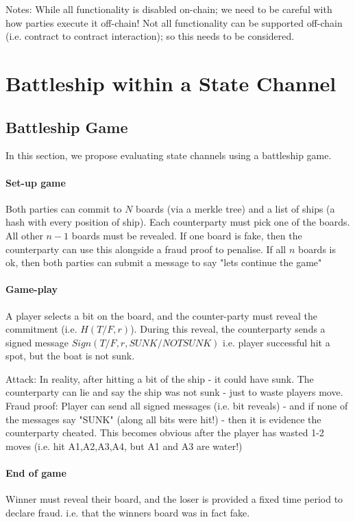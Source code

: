 \documentclass{article}
\begin{document}
Notes: While all functionality is disabled on-chain; we need to be careful with how parties execute it off-chain! Not all functionality can be supported off-chain (i.e. contract to contract interaction); so this needs to be considered. 

\section{Battleship within a State Channel} 

\subsection{Battleship Game} 
In this section, we propose evaluating state channels using a battleship game. 

\paragraph{Set-up game} Both parties can commit to $N$ boards (via a merkle tree) and a list of ships (a hash with every position of ship). Each counterparty must pick one of the boards. All other $n-1$ boards must be revealed. If one board is fake, then the counterparty can use this alongside a fraud proof to penalise. If all $n$ boards is ok, then both parties can submit a message to say "lets continue the game" 

\paragraph{Game-play} A player selects a bit on the board, and the counter-party must reveal the commitment (i.e. $H(T/F,r)$). During this reveal, the counterparty sends a signed message $Sign(T/F,r,SUNK/NOTSUNK)$ i.e. player successful hit a spot, but the boat is not sunk. 

Attack: In reality, after hitting a bit of the ship - it could have sunk. The counterparty can lie and say the ship was not sunk - just to waste players move. 
Fraud proof: Player can send all signed messages (i.e. bit reveals) - and if none of the messages say "SUNK" (along all bits were hit!) - then it is evidence the counterparty cheated. This becomes obvious after the player has wasted 1-2 moves (i.e. hit A1,A2,A3,A4, but A1 and A3 are water!) 

\paragraph{End of game} Winner must reveal their board, and the loser is provided a fixed time period to declare fraud. i.e. that the winners board was in fact fake. 
\end{document}
